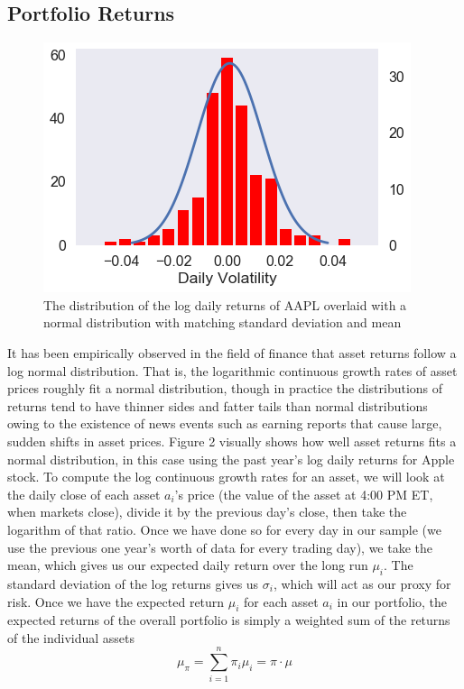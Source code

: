 \documentclass{article}
\begin{document}
\subsection{Portfolio Returns}
\begin{figure}
\includegraphics[scale=0.3]{aaplnormal}
\caption{The distribution of the log daily returns of AAPL overlaid with a normal distribution with matching standard deviation and mean}
\end{figure}
It has been empirically observed in the field of finance that asset returns follow a log normal distribution. That is, the logarithmic continuous growth rates of asset prices roughly fit a normal distribution, though in practice the distributions of returns tend to have thinner sides and fatter tails than normal distributions owing to the existence of news events such as earning reports that cause large, sudden shifts in asset prices. Figure 2 visually shows how well asset returns fits a normal distribution, in this case using the past year’s log daily returns for Apple stock.
To compute the log continuous growth rates for an asset,
we will look at the daily close of each asset $a_i$’s price (the
value of the asset at 4:00 PM ET, when markets close), divide it by the previous day's close, then take the logarithm
of that ratio. Once we have done so for every day in our
sample (we use the previous one year’s worth of data for every trading day), we take the mean, which gives us our expected daily return over the long run $\mu_i$. The standard deviation of the log returns gives us $\sigma_i$, which will act as our proxy for risk.
Once we have the expected return $\mu_i$ for each asset $a_i$ in our portfolio, the expected returns of the overall portfolio is simply a weighted sum of the returns of the individual assets
\begin{equation}
\mu_\pi = \sum_{i=1}^n \pi_i \mu_i = \pi \cdot \mu
\end{equation}
\end{document}
